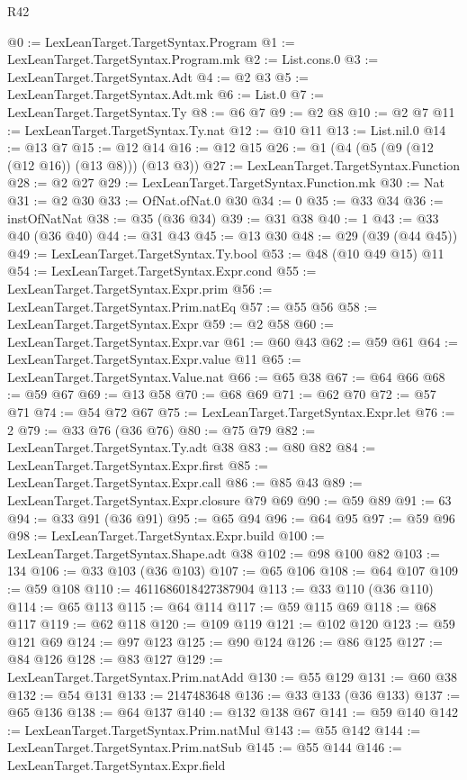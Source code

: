 \begin{lexlean}{R42}
\begin{coremodule}
@0 := LexLeanTarget.TargetSyntax.Program
@1 := LexLeanTarget.TargetSyntax.Program.mk
@2 := List.cons.{0}
@3 := LexLeanTarget.TargetSyntax.Adt
@4 := @2 @3
@5 := LexLeanTarget.TargetSyntax.Adt.mk
@6 := List.{0}
@7 := LexLeanTarget.TargetSyntax.Ty
@8 := @6 @7
@9 := @2 @8
@10 := @2 @7
@11 := LexLeanTarget.TargetSyntax.Ty.nat
@12 := @10 @11
@13 := List.nil.{0}
@14 := @13 @7
@15 := @12 @14
@16 := @12 @15
@26 := @1 (@4 (@5 (@9 (@12 (@12 @16)) (@13 @8))) (@13 @3))
@27 := LexLeanTarget.TargetSyntax.Function
@28 := @2 @27
@29 := LexLeanTarget.TargetSyntax.Function.mk
@30 := Nat
@31 := @2 @30
@33 := OfNat.ofNat.{0} @30
@34 := 0
@35 := @33 @34
@36 := instOfNatNat
@38 := @35 (@36 @34)
@39 := @31 @38
@40 := 1
@43 := @33 @40 (@36 @40)
@44 := @31 @43
@45 := @13 @30
@48 := @29 (@39 (@44 @45))
@49 := LexLeanTarget.TargetSyntax.Ty.bool
@53 := @48 (@10 @49 @15) @11
@54 := LexLeanTarget.TargetSyntax.Expr.cond
@55 := LexLeanTarget.TargetSyntax.Expr.prim
@56 := LexLeanTarget.TargetSyntax.Prim.natEq
@57 := @55 @56
@58 := LexLeanTarget.TargetSyntax.Expr
@59 := @2 @58
@60 := LexLeanTarget.TargetSyntax.Expr.var
@61 := @60 @43
@62 := @59 @61
@64 := LexLeanTarget.TargetSyntax.Expr.value @11
@65 := LexLeanTarget.TargetSyntax.Value.nat
@66 := @65 @38
@67 := @64 @66
@68 := @59 @67
@69 := @13 @58
@70 := @68 @69
@71 := @62 @70
@72 := @57 @71
@74 := @54 @72 @67
@75 := LexLeanTarget.TargetSyntax.Expr.let
@76 := 2
@79 := @33 @76 (@36 @76)
@80 := @75 @79
@82 := LexLeanTarget.TargetSyntax.Ty.adt @38
@83 := @80 @82
@84 := LexLeanTarget.TargetSyntax.Expr.first
@85 := LexLeanTarget.TargetSyntax.Expr.call
@86 := @85 @43
@89 := LexLeanTarget.TargetSyntax.Expr.closure @79 @69
@90 := @59 @89
@91 := 63
@94 := @33 @91 (@36 @91)
@95 := @65 @94
@96 := @64 @95
@97 := @59 @96
@98 := LexLeanTarget.TargetSyntax.Expr.build
@100 := LexLeanTarget.TargetSyntax.Shape.adt @38
@102 := @98 @100 @82
@103 := 134
@106 := @33 @103 (@36 @103)
@107 := @65 @106
@108 := @64 @107
@109 := @59 @108
@110 := 4611686018427387904
@113 := @33 @110 (@36 @110)
@114 := @65 @113
@115 := @64 @114
@117 := @59 @115 @69
@118 := @68 @117
@119 := @62 @118
@120 := @109 @119
@121 := @102 @120
@123 := @59 @121 @69
@124 := @97 @123
@125 := @90 @124
@126 := @86 @125
@127 := @84 @126
@128 := @83 @127
@129 := LexLeanTarget.TargetSyntax.Prim.natAdd
@130 := @55 @129
@131 := @60 @38
@132 := @54 @131
@133 := 2147483648
@136 := @33 @133 (@36 @133)
@137 := @65 @136
@138 := @64 @137
@140 := @132 @138 @67
@141 := @59 @140
@142 := LexLeanTarget.TargetSyntax.Prim.natMul
@143 := @55 @142
@144 := LexLeanTarget.TargetSyntax.Prim.natSub
@145 := @55 @144
@146 := LexLeanTarget.TargetSyntax.Expr.field

\end{coremodule}
\end{lexlean}
